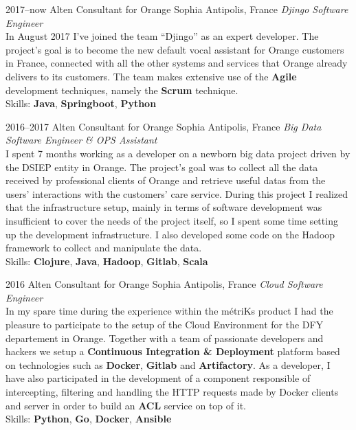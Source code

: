\documentclass[]{friggeri-cv}
\begin{document}
\begin{entrylist}
  \entry
    {2017--now}
    {Alten Consultant for Orange}
    {Sophia Antipolis, France}
    {\emph{Djingo Software Engineer} \\
      In August 2017 I've joined the team ``Djingo'' as an expert developer.
      The project's goal is to become the new default vocal assistant for
      Orange customers in France, connected with all the other systems and
      services that Orange already delivers to its customers.  The team makes
      extensive use of the \textbf{Agile} development techniques, namely the
      \textbf{Scrum} technique. \\
      Skills: \textbf{Java}, \textbf{Springboot}, \textbf{Python}
    }
\end{entrylist}

\begin{entrylist}
  \entry
    {2016--2017}
    {Alten Consultant for Orange}
    {Sophia Antipolis, France}
    {\emph{Big Data Software Engineer \& OPS Assistant} \\
      I spent 7 months working as a developer on a newborn big data project driven by
      the DSIEP entity in Orange.  The project's goal was to collect all the
      data received by professional clients of Orange and retrieve useful datas
      from the users' interactions with the customers' care service.  During this
      project I realized that the infrastructure setup, mainly in terms of software
      development was insufficient to cover the needs of the project itself, so I
      spent some time setting up the development infrastructure.  I also developed
      some code on the Hadoop framework to collect and manipulate the data. \\
      Skills: \textbf{Clojure}, \textbf{Java}, \textbf{Hadoop}, \textbf{Gitlab},
      \textbf{Scala}
    }
\end{entrylist}


\begin{entrylist}
  \entry
    {2016}
    {Alten Consultant for Orange}
    {Sophia Antipolis, France}
    {\emph{Cloud Software Engineer} \\
      In my spare time during the experience within the métriKs product I had
      the pleasure to participate to the setup of the Cloud Environment for the
      DFY departement in Orange.  Together with a team of passionate developers
      and hackers we setup a \textbf{Continuous Integration \& Deployment}
      platform based on technologies such as \textbf{Docker}, \textbf{Gitlab} and
      \textbf{Artifactory}.  As a developer, I have also participated in the
      development of a component responsible of intercepting, filtering and handling
      the HTTP requests made by Docker clients and server in order to build an
      \textbf{ACL} service on top of it. \\
      Skills: \textbf{Python}, \textbf{Go}, \textbf{Docker}, \textbf{Ansible}
    }
\end{entrylist}
\end{document}
